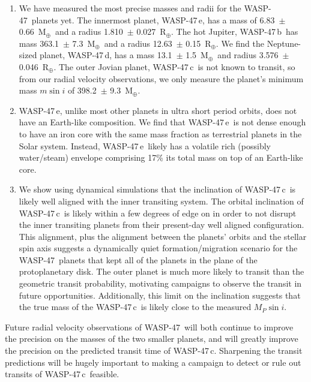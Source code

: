 \documentclass{emulateapj}
\newcommand{\thisstar}{WASP-47}
\newcommand{\thisfirstplanet}{WASP-47\,b}
\newcommand{\thissecondplanet}{WASP-47\,e}
\newcommand{\thisthirdplanet}{WASP-47\,d}
\newcommand{\thisfourthplanet}{WASP-47\,c}
\newcommand{\mearth}{M$_\oplus$}
\newcommand{\rearth}{R$_\oplus$}
\newcommand{\rplb}{12.63}
\newcommand{\urplb}{0.15}
\newcommand{\rple}{1.810}
\newcommand{\urple}{0.027}
\newcommand{\rpld}{3.576}
\newcommand{\urpld}{0.046}
\newcommand{\mplb}{363.1}
\newcommand{\umplb}{7.3}
\newcommand{\mple}{6.83}
\newcommand{\umple}{0.66}
\newcommand{\mpld}{13.1}
\newcommand{\umpld}{1.5}
\newcommand{\mplc}{398.2}
\newcommand{\umplc}{9.3}
\begin{document}
\begin{enumerate}
\item We have measured the most precise masses and radii for the \thisstar\ planets yet. The innermost planet, \thissecondplanet, has a mass of  \mple\ $\pm$ \umple\ \mearth\ and a radius \rple\ $\pm$ \urple\ \rearth. The hot Jupiter, \thisfirstplanet\ has mass \mplb\ $\pm$ \umplb\ \mearth\ and a radius \rplb\ $\pm$ \urplb\ \rearth. We find the Neptune-sized planet, \thisthirdplanet, has a mass \mpld\ $\pm$ \umpld\ \mearth\ and radius \rpld\ $\pm$ \urpld\ \rearth. The outer Jovian planet, \thisfourthplanet\ is not known to transit, so from our radial velocity observations, we only measure the planet's minimum mass $m\sin{i}$ of \mplc\ $\pm$ \umplc\ \mearth. 
\item \thissecondplanet, unlike most other planets in ultra short period orbits, does not have an Earth-like composition. We find that \thissecondplanet\ is not dense enough to have an iron core with the same mass fraction as terrestrial planets in the Solar system. Instead, \thissecondplanet\ likely has a volatile rich (possibly water/steam) envelope comprising 17\% its total mass on top of an Earth-like core. 
\item We show using dynamical simulations that the inclination of \thisfourthplanet\ is likely well aligned with the inner transiting system. The orbital inclination of \thisfourthplanet\ is likely within a few degrees of edge on in order to not disrupt the inner transiting planets from their present-day well aligned configuration. This alignment, plus the alignment between the planets' orbits and the stellar spin axis \citep{sanchisojedaw47rm} suggests a dynamically quiet formation/migration scenario for the \thisstar\ planets that kept all of the planets in the plane of the protoplanetary disk. The outer planet is much more likely to transit than the geometric transit probability, motivating campaigns to observe the transit in future opportunities. Additionally, this limit on the inclination suggests that the true mass of the \thisfourthplanet\ is likely close to the measured $M_P\sin{i}$.
\end{enumerate}

Future radial velocity observations of \thisstar\ will both continue to improve the precision on the masses of the two smaller planets, and will greatly improve the precision on the predicted transit time of \thisfourthplanet. Sharpening the transit predictions will be hugely important to making a campaign to detect or rule out transits of \thisfourthplanet\ feasible.
\end{document}
